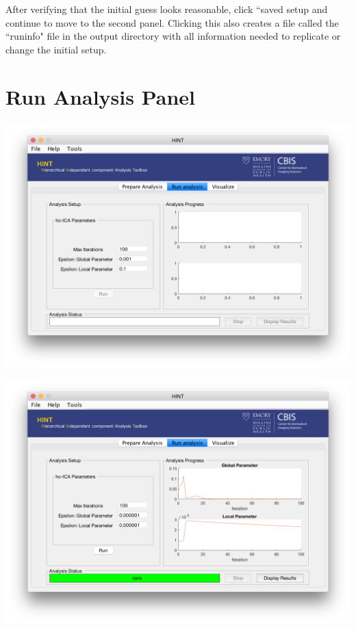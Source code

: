 \documentclass[11pt]{beamer}
\begin{document}
\begin{frame}
After verifying that the initial guess looks reasonable, click ``saved setup and continue to move to the second panel. Clicking this also creates a file called the ``runinfo" file in the output directory with all information needed to replicate or change the initial setup.
\end{frame}

\section{Run Analysis Panel}

\begin{frame}
\includegraphics[width=1\linewidth]{figs/panel2empty}
\end{frame}

\begin{frame}
\includegraphics[width=1\linewidth]{figs/panel2filled}
\end{frame}
\end{document}
